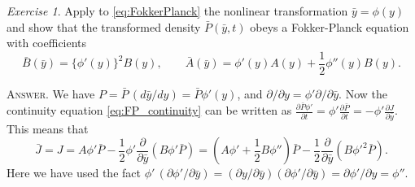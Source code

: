 \documentclass{book}
\numberwithin{equation}{section}
\theoremstyle{plain}
\theoremstyle{definition}
\theoremstyle{remark}
\theoremstyle{BoldStyle}
\newtheorem{exercise}{Exercise}
\numberwithin{exercise}{section}
\newcommand{\answer}[1]{{\color{DarkBlue}\footnotesize \textsc{Answer.} #1}}
\begin{document}
\begin{exercise}
  Apply to \eqref{eq:FokkerPlanck}
  the nonlinear transformation $\bar y = \phi(y)$
  and show that the transformed density $\bar P(\bar y, t)$
  obeys a Fokker-Planck equation with coefficients
  \begin{equation}
    \bar B(\bar y) = \{ \phi'(y) \}^2 B(y),
    \qquad
    \bar A(\bar y) = \phi'(y) A(y) + \frac{1}{2} \phi''(y) B(y).
    \label{eq:FP_nonlineartransform}
  \end{equation}

  \answer{We have
    $P = \bar P \, (d\bar y/dy) = \bar P \phi'(y)$,
    and
    $\partial/\partial y = \phi' \partial/\partial \bar y$.
    Now the continuity equation \eqref{eq:FP_continuity}
    can be written as
    $\frac{ \partial \bar P \phi' } { \partial t }
    = \phi' \frac{ \partial \bar P } { \partial t}
    = -\phi' \frac{ \partial J } { \partial \bar y}.$
    This means that
    $$\bar J = J = A \phi' \bar P - \frac{1}{2} \phi'
    \frac{\partial}{\partial \bar y} (B \phi' \bar P)
    =
    (A \phi' + \frac{1}{2} B\phi'') \bar P
    - \frac{1}{2} \frac{\partial}{\partial \bar y} (B \phi'^2 \bar P).$$
    Here we have used the fact
    $\phi' \, \left( \partial \phi'/\partial \bar y \right)
    = (\partial y/\partial \bar y) (\partial \phi' /\partial \bar y)
    = \partial \phi'/\partial y = \phi''$.
  }
\end{exercise}
\end{document}
